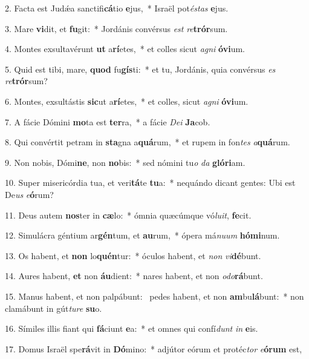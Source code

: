 2. Facta est Judǽa sanctifi\textbf{cá}tio \textbf{e}jus,~*  Israël pot\textit{és}\textit{tas} \textbf{e}jus.\

3. Mare \textbf{vi}dit, et \textbf{fu}git:~*  Jordánis convérsus \textit{est} \textit{re}\textbf{trór}sum.\

4. Montes exsultavérunt \textbf{ut} a\textbf{rí}etes,~*  et colles sicut \textit{a}\textit{gni} \textbf{ó}\textbf{vi}um.\

5. Quid est tibi, mare, \textbf{quod} fu\textbf{gís}ti:~*  et tu, Jordánis, quia convérsus \textit{es} \textit{re}\textbf{trór}sum?\

6. Montes, exsultástis \textbf{sic}ut a\textbf{rí}etes,~*  et colles, sicut \textit{a}\textit{gni} \textbf{ó}\textbf{vi}um.\

7. A fácie Dómini \textbf{mo}ta est \textbf{ter}ra,~*  a fácie \textit{De}\textit{i} \textbf{Ja}cob.\

8. Qui convértit petram in \textbf{sta}gna a\textbf{quá}rum,~*  et rupem in fon\textit{tes} \textit{a}\textbf{quá}rum.\

9. Non nobis, Dómi\textbf{ne}, non \textbf{no}bis:~*  sed nómini tu\textit{o} \textit{da} \textbf{gló}\textbf{ri}am.\

10. Super misericórdia tua, et veri\textbf{tá}te \textbf{tu}a:~*  nequándo dicant gentes: Ubi est De\textit{us} \textit{e}\textbf{ó}rum?\

11. Deus autem \textbf{nos}ter in \textbf{cæ}lo:~*  ómnia quæcúmque vó\textit{lu}\textit{it}, \textbf{fe}cit.\

12. Simulácra géntium ar\textbf{gén}tum, et \textbf{au}rum,~*  ópera má\textit{nu}\textit{um} \textbf{hó}\textbf{mi}num.\

13. Os habent, et \textbf{non} lo\textbf{quén}tur:~*  óculos habent, et \textit{non} \textit{vi}\textbf{dé}bunt.\

14. Aures habent, \textbf{et} non \textbf{áu}dient:~*  nares habent, et non \textit{o}\textit{do}\textbf{rá}bunt.\

15. Manus habent, et non palpábunt: \dag\  pedes habent, et non \textbf{am}bu\textbf{lá}bunt:~*  non clamábunt in gút\textit{tu}\textit{re} \textbf{su}o.\

16. Símiles illis fiant qui \textbf{fá}ciunt \textbf{e}a:~*  et omnes qui confí\textit{dunt} \textit{in} \textbf{e}is.\

17. Domus Israël spe\textbf{rá}vit in \textbf{Dó}mino:~*  adjútor eórum et protéc\textit{tor} \textit{e}\textbf{ó}\textbf{rum} est,\

